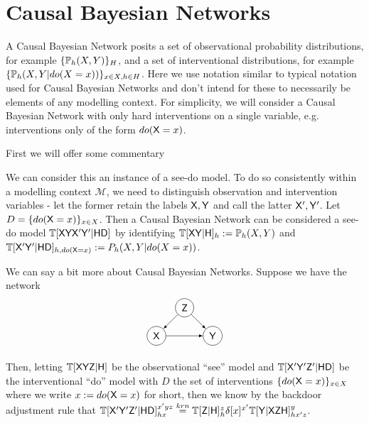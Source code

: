 

\section{Causal Bayesian Networks}

A Causal Bayesian Network posits a set of observational probability distributions, for example $\{\mathbb{P}_h(X,Y)\}_H$, and a set of interventional distributions, for example $\{\mathbb{P}_h(X,Y|do(X=x))\}_{x\in X,h\in H}$. Here we use notation similar to typical notation used for Causal Bayesian Networks and don't intend for these to necessarily be elements of any modelling context. For simplicity, we will consider a Causal Bayesian Network with only hard interventions on a single variable, e.g. interventions only of the form $do(\mathsf{X}=x)$.

First we will offer some commentary



We can consider this an instance of a see-do model. To do so consistently within a modelling context $\mathscr{M}$, we need to distinguish observation and intervention variables - let the former retain the labels $\mathsf{X},\mathsf{Y}$ and call the latter $\mathsf{X}',\mathsf{Y}'$. Let $D=\{do(\mathsf{X}=x)\}_{x\in X}$. Then a Causal Bayesian Network can be considered a see-do model $\mathbb{T}[\mathsf{XYX'Y'}|\mathsf{HD}]$ by identifying $\mathbb{T}[\mathsf{XY}|\mathsf{H}]_h := \mathbb{P}_h(X,Y)$ and $\mathbb{T}[\mathsf{X'Y'}|\mathsf{HD}]_{h,do(\mathsf{X}=x)}:={P}_h(X,Y|do(X=x))$.


We can say a bit more about Causal Bayesian Networks. Suppose we have the network
\begin{align*}
\begin{tikzpicture}
    \path (0,0) node[draw,circle] (X) {$\RV{X}$}
    ++ (1,1) node[draw,circle] (Z) {$\RV{Z}$}
    ++ (1,-1) node[draw, circle] (Y) {$\RV{Y}$};
    \draw[-latex] (X)--(Y);
    \draw[-latex] (Z) -- (Y);
    \draw[-latex] (Z) -- (X);
\end{tikzpicture}
\end{align*}

Then, letting $\mathbb{T}[\mathsf{XYZ}|\mathsf{H}]$ be the observational ``see'' model and $\mathbb{T}[\mathsf{X'Y'Z'}|\mathsf{HD}]$ be the interventional ``do'' model with $D$ the set of interventions $\{do(\mathsf{X}=x)\}_{x\in X}$ where we write $x:=do(\mathsf{X}=x)$ for short, then we know by the backdoor adjustment rule that $\mathbb{T}[\mathsf{X'Y'Z'}|\mathsf{HD}]_{hx}^{x'yz} \overset{krn}{=} \mathbb{T}[\mathsf{Z}|\mathsf{H}]_h^z \delta[x]^{x'} \mathbb{T}[\mathsf{Y}|\mathsf{XZH}]_{hx'z}^y$. 

